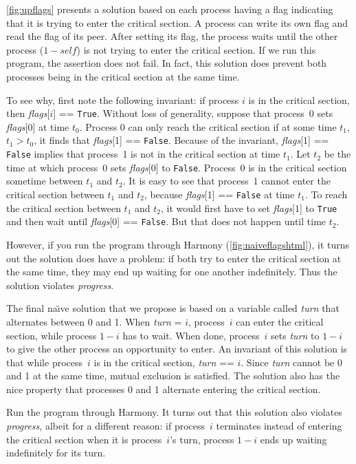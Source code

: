 \documentclass{report}
\begin{document}
\autoref{fig:upflags} presents a solution based on each process having
a flag indicating that it is trying to enter the critical section.
A process can write its own flag and read the flag of its peer.
After setting its flag, the process waits until the other process
($1 - \mathit{self}$) is not trying to enter the critical section.
If we run this program, the assertion does not fail.  In fact, this
solution does prevent both processes being in the critical section at
the same time.

To see why, first note the following invariant: if process $i$ is in the
critical section, then \textit{flags}[$i$] == \texttt{True}.
Without loss of generality,
suppose that process~0 sets \textit{flags}[0] at time $t_0$.
Process 0 can only reach the critical section if at some time $t_1$,
$t_1 > t_0$, it finds that \textit{flags}[1] == \texttt{False}.
Because of the invariant, \textit{flags}[1] == \texttt{False} implies that
process~1 is not in the critical section at time $t_1$.
Let $t_2$ be the time at which process~0 sets \textit{flags}[0]
to \texttt{False}.  Process~0 is in the critical section sometime
between $t_1$ and $t_2$.
It is easy to see that process~1 cannot enter the critical section
between $t_1$ and $t_2$, because \textit{flags}[1] == \texttt{False} at
time $t_1$.  To reach the critical section between $t_1$ and $t_2$,
it would first have to set \textit{flags}[1] to \texttt{True} and
then wait until \textit{flags}[0] == \texttt{False}.  But that does not happen
until time $t_2$.

However, if you run the program through Harmony (\autoref{fig:naiveflagshtml}),
it turns out the solution
does have a problem: if both try to enter the critical section at the same
time, they may end up waiting for one another indefinitely.  Thus the
solution violates \emph{progress}.

The final na\"{\i}ve solution that we propose
is based on a variable called \textit{turn}
that alternates between 0 and 1.  When \textit{turn} = $i$, process~$i$ can
enter the critical section, while process $1-i$ has to wait.  When done,
process~$i$ sets \textit{turn} to $1-i$ to give the other process an
opportunity to enter.
An invariant of this solution is that while process~$i$ is in the critical
section, \textit{turn} == $i$.
Since \textit{turn} cannot be 0 and 1 at
the same time, mutual exclusion is satisfied.
The solution also has the nice property that
processes 0 and 1 alternate entering the critical section.

Run the program through Harmony.  It turns out that this solution also violates
\emph{progress}, albeit for a different reason:
if process~$i$ terminates instead of entering the critical section when it
is process~$i$'s turn, process $1-i$ ends up waiting indefinitely for its
turn.
\end{document}
